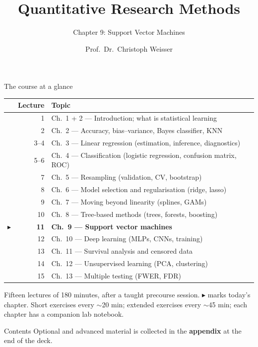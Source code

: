 \documentclass[aspectratio=169,11pt]{beamer}
\title{Quantitative Research Methods}
\subtitle{Chapter 9: Support Vector Machines}
\author{Prof.\ Dr.\ Christoph Weisser}\institute{HSBI}
\date{}\graphicspath{{images/}}
\begin{document}
\begin{frame}[plain]\titlepage\end{frame}

\begin{frame}{The course at a glance}
  \footnotesize
  \begin{center}
  \begin{tabular}{@{}c r l@{}}
    & \textbf{Lecture} & \textbf{Topic}\\
    \midrule
     & 1 & Ch.\ 1 + 2 --- Introduction; what is statistical learning \\
     & 2 & Ch.\ 2 --- Accuracy, bias--variance, Bayes classifier, KNN \\
     & 3--4 & Ch.\ 3 --- Linear regression (estimation, inference, diagnostics) \\
     & 5--6 & Ch.\ 4 --- Classification (logistic regression, confusion matrix, ROC) \\
     & 7 & Ch.\ 5 --- Resampling (validation, CV, bootstrap) \\
     & 8 & Ch.\ 6 --- Model selection and regularisation (ridge, lasso) \\
     & 9 & Ch.\ 7 --- Moving beyond linearity (splines, GAMs) \\
     & 10 & Ch.\ 8 --- Tree-based methods (trees, forests, boosting) \\
    $\blacktriangleright$ & \textbf{11} & \textbf{Ch.\ 9 --- Support vector machines} \\
     & 12 & Ch.\ 10 --- Deep learning (MLPs, CNNs, training) \\
     & 13 & Ch.\ 11 --- Survival analysis and censored data \\
     & 14 & Ch.\ 12 --- Unsupervised learning (PCA, clustering) \\
     & 15 & Ch.\ 13 --- Multiple testing (FWER, FDR) \\
  \end{tabular}
  \end{center}
  \vspace{2pt}
  {\scriptsize Fifteen lectures of 180 minutes, after a taught precourse session. $\blacktriangleright$ marks today's chapter. Short exercises every $\sim$20 min; extended exercises every $\sim$45 min; each chapter has a companion lab notebook.}
\end{frame}

\begin{frame}{Contents}\small\tableofcontents[hideallsubsections]
  \vfill
  {\tiny Optional and advanced material is collected in the \textbf{appendix} at the end of the deck.}
\end{frame}
\end{document}
